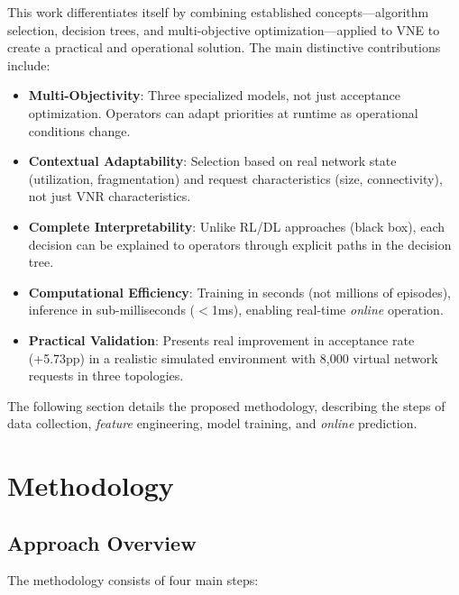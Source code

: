 \documentclass[conference]{IEEEtran}
\begin{document}
This work differentiates itself by combining established concepts---algorithm selection, decision trees, and multi-objective optimization---applied to VNE to create a practical and operational solution. The main distinctive contributions include:
\begin{itemize}
    \item \textbf{Multi-Objectivity}: Three specialized models, not just acceptance optimization. Operators can adapt priorities at runtime as operational conditions change.

    \item \textbf{Contextual Adaptability}: Selection based on real network state (utilization, fragmentation) and request characteristics (size, connectivity), not just VNR characteristics.

    \item \textbf{Complete Interpretability}: Unlike RL/DL approaches (black box), each decision can be explained to operators through explicit paths in the decision tree.

    \item \textbf{Computational Efficiency}: Training in seconds (not millions of episodes), inference in sub-milliseconds ($<$1ms), enabling real-time \textit{online} operation.

    \item \textbf{Practical Validation}: Presents real improvement in acceptance rate (+5.73pp) in a realistic simulated environment with 8,000 virtual network requests in three topologies.
\end{itemize}

The following section details the proposed methodology, describing the steps of data collection, \textit{feature} engineering, model training, and \textit{online} prediction.

\section{Methodology}
\label{sec:Proposal}

\subsection{Approach Overview}

The methodology consists of four main steps:
\end{document}
